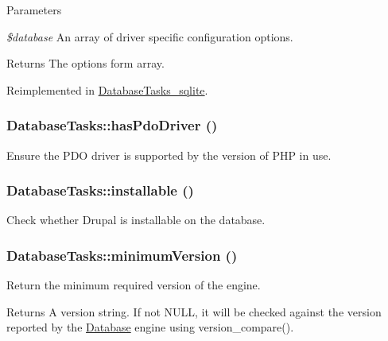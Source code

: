\begin{DoxyParams}{Parameters}
\item[{\em \$database}]An array of driver specific configuration options.\end{DoxyParams}
\begin{DoxyReturn}{Returns}
The options form array. 
\end{DoxyReturn}


Reimplemented in \hyperlink{classDatabaseTasks__sqlite_a8406f646a0461ef07f4d9ad01279aaea}{DatabaseTasks\_\-sqlite}.\hypertarget{classDatabaseTasks_a04d6c3b18630c969106bb890a0156e34}{
\subsubsection[{hasPdoDriver}]{\setlength{\rightskip}{0pt plus 5cm}DatabaseTasks::hasPdoDriver ()}}
\label{classDatabaseTasks_a04d6c3b18630c969106bb890a0156e34}
Ensure the PDO driver is supported by the version of PHP in use. \hypertarget{classDatabaseTasks_aea31e0c70a1870a0290ab2ee06f364e1}{
\subsubsection[{installable}]{\setlength{\rightskip}{0pt plus 5cm}DatabaseTasks::installable ()}}
\label{classDatabaseTasks_aea31e0c70a1870a0290ab2ee06f364e1}
Check whether Drupal is installable on the database. \hypertarget{classDatabaseTasks_a840dd551944911605ee2e139a434efea}{
\subsubsection[{minimumVersion}]{\setlength{\rightskip}{0pt plus 5cm}DatabaseTasks::minimumVersion ()}}
\label{classDatabaseTasks_a840dd551944911605ee2e139a434efea}
Return the minimum required version of the engine.

\begin{DoxyReturn}{Returns}
A version string. If not NULL, it will be checked against the version reported by the \hyperlink{classDatabase}{Database} engine using version\_\-compare(). 
\end{DoxyReturn}


